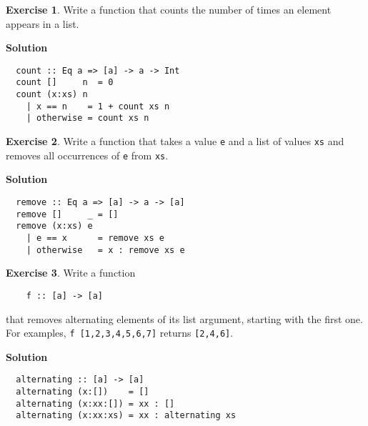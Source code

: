 \documentclass[11pt,a4paper]{article}
\theoremstyle{definition}
\newtheorem{exr}{Exercise}
\begin{document}
\newpage

\begin{exr}
  Write a function that counts the number of times an element appears in a list.
\end{exr}

\textbf{Solution}
\begin{lstlisting}
  count :: Eq a => [a] -> a -> Int
  count []     n  = 0
  count (x:xs) n
    | x == n    = 1 + count xs n
    | otherwise = count xs n
\end{lstlisting}


\vspace{5mm}

\begin{exr}
  Write a function that takes a value \texttt{e} and a list of values \texttt{xs}
  and removes all occurrences of \texttt{e} from \texttt{xs}.
\end{exr}

\textbf{Solution}
\begin{lstlisting}
  remove :: Eq a => [a] -> a -> [a]
  remove []     _ = []
  remove (x:xs) e
    | e == x      = remove xs e
    | otherwise   = x : remove xs e
\end{lstlisting}


\vspace{5mm}

\begin{exr}
  Write a function 
  
  \begin{lstlisting}
    f :: [a] -> [a]
  \end{lstlisting}

  that removes alternating elements of its list argument, starting with 
  the first one. For examples, \texttt{f [1,2,3,4,5,6,7]} returns 
  \texttt{[2,4,6]}.
\end{exr}

\textbf{Solution}
\begin{lstlisting}
  alternating :: [a] -> [a]
  alternating (x:[])    = []
  alternating (x:xx:[]) = xx : []
  alternating (x:xx:xs) = xx : alternating xs
\end{lstlisting}
\end{document}
